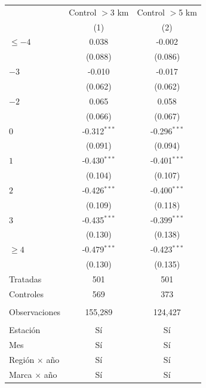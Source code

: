 
\begingroup
\centering
\begin{tabular}{lcc}
   \toprule
                        & Control $>$3 km & Control $>$5 km \\   
                        & (1)             & (2)\\  
   \midrule 
   $\leq -4$            & 0.038           & -0.002\\   
                        & (0.088)         & (0.086)\\   
   $-3$                 & -0.010          & -0.017\\   
                        & (0.062)         & (0.062)\\   
   $-2$                 & 0.065           & 0.058\\   
                        & (0.066)         & (0.067)\\   
   $0$                  & -0.312$^{***}$  & -0.296$^{***}$\\   
                        & (0.091)         & (0.094)\\   
   $1$                  & -0.430$^{***}$  & -0.401$^{***}$\\   
                        & (0.104)         & (0.107)\\   
   $2$                  & -0.426$^{***}$  & -0.400$^{***}$\\   
                        & (0.109)         & (0.118)\\   
   $3$                  & -0.435$^{***}$  & -0.399$^{***}$\\   
                        & (0.130)         & (0.138)\\   
   $\geq 4$             & -0.479$^{***}$  & -0.423$^{***}$\\   
                        & (0.130)         & (0.135)\\   
   Tratadas             & 501             & 501\\  
   Controles            & 569             & 373\\  
    \\
   Observaciones        & 155,289         & 124,427\\  
    \\
   Estación             & Sí              & Sí\\  
   Mes                  & Sí              & Sí\\  
   Región $\times$ año  & Sí              & Sí\\  
   Marca $\times$ año   & Sí              & Sí\\  
   \bottomrule
\end{tabular}
\par\endgroup



